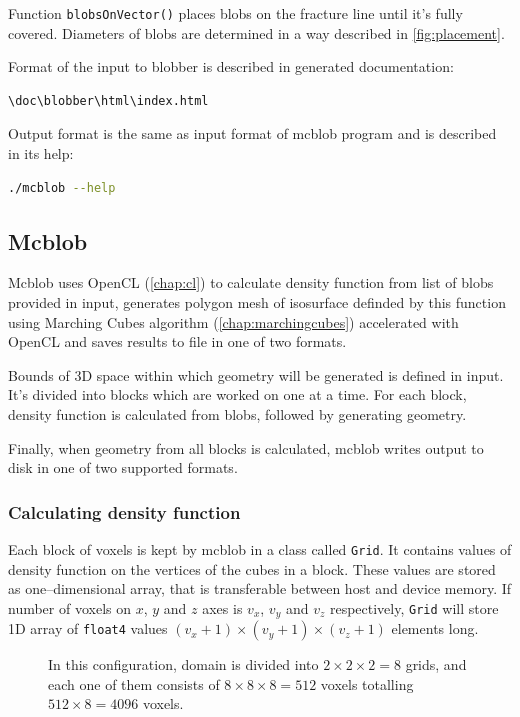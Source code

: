 Function \texttt{blobsOnVector()} places blobs on the fracture line until
it's fully covered. Diameters of blobs are determined in a way described
in \autoref{fig:placement}.

Format of the input to blobber is described in generated documentation:
\begin{lstlisting}[language=bash,numbers=none]
\doc\blobber\html\index.html
\end{lstlisting}

Output format is the same as input format of mcblob program and is described in
its help:
\begin{lstlisting}[language=bash,numbers=none]
./mcblob --help
\end{lstlisting}

\subsection{Mcblob}
\label{sub:mcblob}

Mcblob uses OpenCL (\autoref{chap:cl}) to calculate density function from
list of blobs provided in input, generates polygon mesh of isosurface
definded by this function using Marching Cubes algorithm (\autoref{chap:marchingcubes})
accelerated with OpenCL and saves results to file in one of two formats.

Bounds of 3D space within which geometry will be generated is defined in input.
It's divided into blocks which are worked on one at a time. For each block,
density function is calculated from blobs, followed by generating geometry.

Finally, when geometry from all blocks is calculated, mcblob writes output to
disk in one of two supported formats.

\subsubsection{Calculating density function}

Each block of voxels is kept by mcblob in a class called \texttt{Grid}. It
contains values of density function on the vertices of the cubes in a block.
These values are stored as one--dimensional array, that is transferable between host and
device memory. If number of voxels on $x$, $y$ and $z$ axes is $v_x$, $v_y$
and $v_z$ respectively, \texttt{Grid} will store 1D array
of \texttt{float4} values $(v_x+1)\times(v_y+1)\times(v_z+1)$ elements long.

\begin{figure}[tb]
  \begin{center}
    
  \end{center}
  \caption{In this configuration, domain is divided into $2\times2\times2=8$
  grids, and each one of them consists of $8\times8\times8=512$ voxels totalling
 $512\times8=4096$ voxels.}
  \label{fig:grid}
\end{figure}

